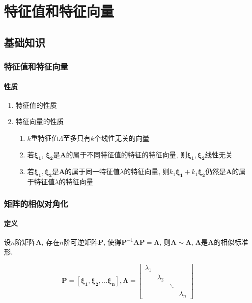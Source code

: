 \documentclass[oneside, onecolumn]{ctexbook}
\begin{document}
\chapter{特征值和特征向量}
\section{基础知识}
\subsection{特征值和特征向量}
\subsubsection{性质}
\begin{enumerate}
	\item 特征值的性质
	\item 特征向量的性质
	\begin{enumerate}
		\item $ k $重特征值$ \Lambda $至多只有$ k $个线性无关的向量
		\item 若$ \bm{\xi_1} $, $ \bm{\xi_2} $是$ \bm{A} $的属于不同特征值的特征的特征向量, 则$ \bm{\xi_1}, \bm{\xi_2} $线性无关
		\item 若$ \bm{\xi_1}, \bm{\xi_2} $是$ \bm{A} $的属于同一特征值$ \lambda $的特征向量, 则$ k_1\bm{\xi_1} + k_1\bm{\xi_2} $仍然是$ \bm{A} $的属于特征值$ \lambda $的特征向量
	\end{enumerate}
\end{enumerate}
\subsection{矩阵的相似对角化}
\subsubsection{定义}
设$ n $阶矩阵$ \bm{A} $, 存在$ n $阶可逆矩阵$ \bm{P} $, 使得$ \bm{P}^{-1}\bm{A}\bm{P}=\bm{\Lambda} $, 则$ \bm{A}\sim \bm{\Lambda} $, $ \bm{\Lambda} $是$ \bm{A} $的相似标准形.\par 
\[ \bm{P}=\left[\bm{\xi_1}, \bm{\xi_2},... \bm{\xi_n}\right], \bm{\Lambda} =\begin{bmatrix}
	\lambda_1 &  &  &  \\
	& \lambda_2 &  &  \\
	&  & \ddots &  \\
	&  &  & \lambda_n 
\end{bmatrix}
 \]
\end{document}
